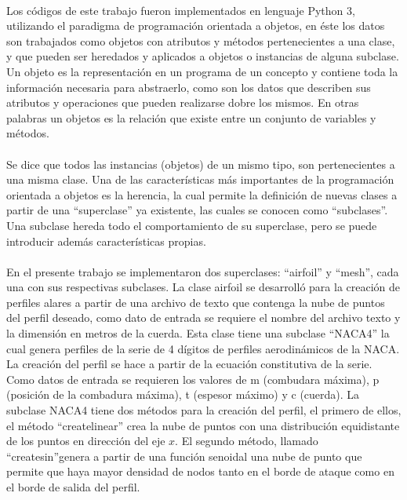 \documentclass[letterpaper, openright, 12pt]{book}
\begin{document}
	\paragraph*{}
		Los códigos de este trabajo fueron implementados en lenguaje Python 3, utilizando el paradigma de programación orientada a objetos, en éste los datos son trabajados como objetos con atributos y métodos pertenecientes a una clase, y que pueden ser heredados y aplicados a objetos o instancias de alguna subclase. Un objeto  es la representación en un programa de un concepto y contiene toda la información necesaria para abstraerlo, como son los datos que describen sus atributos y operaciones que pueden realizarse dobre los mismos.  En otras palabras un objetos es la relación que existe entre un conjunto de variables y métodos.
	
	\paragraph*{}
		Se dice que todos las instancias (objetos) de un mismo tipo, son pertenecientes a una misma clase. Una de las características más importantes de la programación orientada a objetos es la herencia, la cual permite la definición de nuevas clases a partir de una ``superclase'' ya existente, las cuales se conocen como ``subclases''. Una subclase hereda todo el comportamiento de su superclase, pero se puede introducir además características propias.
		
	\paragraph*{}
		En el presente trabajo se implementaron dos superclases: ``airfoil'' y ``mesh'', cada una con sus respectivas subclases.
		La clase airfoil se desarrolló para la creación de perfiles alares a partir de una archivo de texto que contenga la nube de puntos del perfil deseado, como dato de entrada se requiere el nombre del archivo texto y la dimensión en metros de la cuerda. Esta clase tiene una subclase ``NACA4'' la cual genera perfiles de la serie de 4 dígitos de perfiles aerodinámicos de la NACA. La creación del perfil se hace a partir de la ecuación constitutiva de la serie. Como datos de entrada se requieren los valores de m (combudara máxima), p (posición de la combadura máxima), t (espesor máximo) y c (cuerda). La subclase NACA4 tiene dos métodos para la creación del perfil, el primero de ellos, el método ``create\textunderscore linear'' crea la nube de puntos con una distribución equidistante de los puntos en dirección del eje $x$. El segundo método, llamado ``create\textunderscore sin''genera a partir de una función senoidal una nube de punto que permite que haya mayor densidad de nodos tanto en el borde de ataque como en el borde de salida del perfil.
			 
			 
				
			
		 
		
		
		
		
	
	\cleardoublepage
	
	
	
	
	
	
\end{document}
